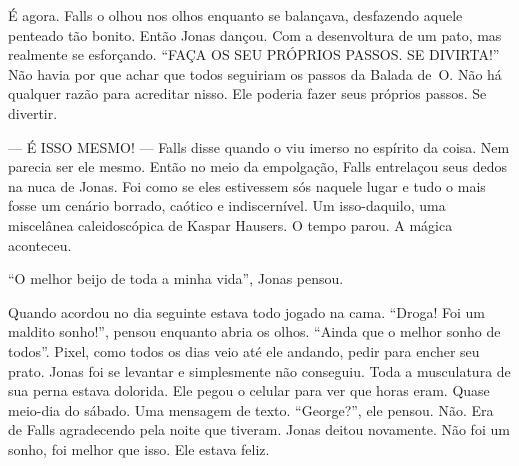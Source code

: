 É agora. Falls o olhou nos olhos enquanto se balançava, desfazendo aquele penteado tão bonito. Então Jonas dançou. Com a desenvoltura de um pato, mas realmente se esforçando. ``FAÇA OS SEU PRÓPRIOS PASSOS. SE DIVIRTA!'' Não havia por que achar que todos seguiriam os passos da Balada de~O. Não há qualquer razão para acreditar nisso. Ele poderia fazer seus próprios passos. Se divertir.

--- É ISSO MESMO! --- Falls disse\mudanca{,} quando o viu imerso no espírito da coisa. Nem parecia ser ele mesmo. Então no meio da empolgação, Falls entrelaçou seus dedos na nuca de Jonas. Foi como se eles estivessem sós naquele lugar e tudo o mais fosse um cenário borrado, caótico e indiscernível. Um isso-daquilo, uma miscelânea caleidoscópica de Kaspar Hausers. O tempo parou. A mágica aconteceu.

``O melhor beijo de toda a minha vida'', Jonas pensou.

Quando acordou\mudanca{,} no dia seguinte\mudanca{,} estava todo jogado na cama. ``Droga! Foi um maldito sonho!'', pensou enquanto abria os olhos. ``Ainda que o melhor sonho de todos''. Pixel, como todos os dias\mudanca{,} veio até ele andando, pedir para encher seu prato. Jonas foi se levantar e simplesmente não conseguiu. Toda a musculatura de sua perna estava dolorida. Ele pegou o celular para ver que horas eram. Quase meio-dia do sábado. Uma mensagem de texto. ``George?'', ele pensou. Não. Era de Falls\mudanca{,} agradecendo pela noite que tiveram. Jonas deitou novamente. Não foi um sonho, foi melhor que isso. Ele estava feliz.

